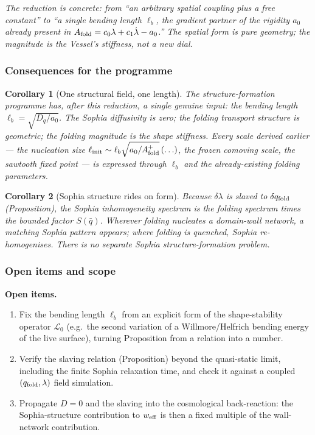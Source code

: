 \documentclass[11pt,a4paper]{article}
\newcommand{\qf}{q_{\rm fold}}
\newcommand{\Af}{A_{\rm fold}}
\newcommand{\Dq}{D_q}
\newcommand{\linit}{\ell_{\rm init}}
\newcommand{\lb}{\ell_b}
\newcommand{\Lop}{\mathcal L_0}
\newcommand{\note}[1]{\textcolor{black!65}{\emph{#1}}}
\theoremstyle{plain}
\newtheorem{corollary}{Corollary}[section]
\theoremstyle{definition}
\theoremstyle{remark}
\begin{document}
\note{The reduction is concrete: from ``an arbitrary spatial coupling plus a free constant'' to
``a single bending length $\lb$, the gradient partner of the rigidity $a_0$ already present in
$\Af=c_0\lambda+c_1\dot\lambda-a_0$.'' The spatial form is pure geometry; the magnitude is the Vessel's
stiffness, not a new dial.}

\subsubsection{Consequences for the programme}

\begin{corollary}[One structural field, one length]
The structure-formation programme has, after this reduction, a single genuine input: the bending length
$\lb=\sqrt{\Dq/a_0}$. The Sophia diffusivity is zero; the folding transport structure is geometric; the
folding magnitude is the shape stiffness. Every scale derived earlier --- the nucleation size
$\linit\sim\lb\sqrt{a_0/\Af^+}\,(\ldots)$, the frozen comoving scale, the sawtooth fixed point --- is
expressed through $\lb$ and the already-existing folding parameters.
\end{corollary}

\begin{corollary}[Sophia structure rides on form]
Because $\delta\lambda$ is slaved to $\delta\qf$ (Proposition), the Sophia inhomogeneity
spectrum is the folding spectrum times the bounded factor $S(\bar q)$. Wherever folding nucleates a
domain-wall network, a matching Sophia pattern appears; where folding is quenched, Sophia re-homogenises.
There is no separate Sophia structure-formation problem.
\end{corollary}

\subsubsection{Open items and scope}

\textbf{Open items.}
\begin{enumerate}[leftmargin=1.6em,itemsep=2pt]
\item Fix the bending length $\lb$ from an explicit form of the shape-stability operator $\Lop$ (e.g.\
the second variation of a Willmore/Helfrich bending energy of the live surface), turning
Proposition from a relation into a number.
\item Verify the slaving relation (Proposition) beyond the quasi-static limit, including
the finite Sophia relaxation time, and check it against a coupled $(\qf,\lambda)$ field simulation.
\item Propagate $D=0$ and the slaving into the cosmological back-reaction: the Sophia-structure
contribution to $w_{\rm eff}$ is then a fixed multiple of the wall-network contribution.
\end{enumerate}
\end{document}
